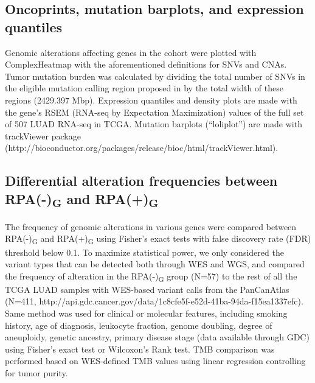 \documentclass[phd,tocprelim]{cornell}
\begin{document}
\subsection*{Oncoprints, mutation barplots, and expression quantiles}
Genomic alterations affecting genes in the cohort were plotted with ComplexHeatmap \cite{Gu2016-ft} with the aforementioned definitions for SNVs and CNAs. Tumor mutation burden was calculated by dividing the total number of SNVs in the eligible mutation calling region proposed in \cite{Li2014-mj} by the total width of these regions (2429.397 Mbp). Expression quantiles and density plots are made with the gene’s RSEM (RNA-seq by Expectation Maximization) values of the full set of 507 LUAD RNA-seq in TCGA. Mutation barplots (“loliplot”) are made with trackViewer package (http://bioconductor.org/packages/release/bioc/html/trackViewer.html).

\clearpage
\subsection*{Differential alteration frequencies between RPA(-)\textsubscript{G} and RPA(+)\textsubscript{G}}
The frequency of genomic alterations in various genes were compared between RPA(-)\textsubscript{G} and RPA(+)\textsubscript{G} using Fisher’s exact tests with false discovery rate (FDR) threshold below 0.1. To maximize statistical power, we only considered the variant types that can be detected both through WES and WGS, and compared the frequency of alteration in the RPA(-)\textsubscript{G} group (N=57) to the rest of all the TCGA LUAD samples with WES-based variant calls from the PanCanAtlas (N=411, http://api.gdc.cancer.gov/data/1c8cfe5f-e52d-41ba-94da-f15ea1337efc). Same method was used for clinical or molecular features, including smoking history, age of diagnosis, leukocyte fraction, genome doubling, degree of aneuploidy, genetic ancestry, primary disease stage (data available through GDC) using Fisher’s exact test or Wilcoxon’s Rank test. TMB comparison was performed based on WES-defined TMB values using linear regression controlling for tumor purity.
\end{document}
